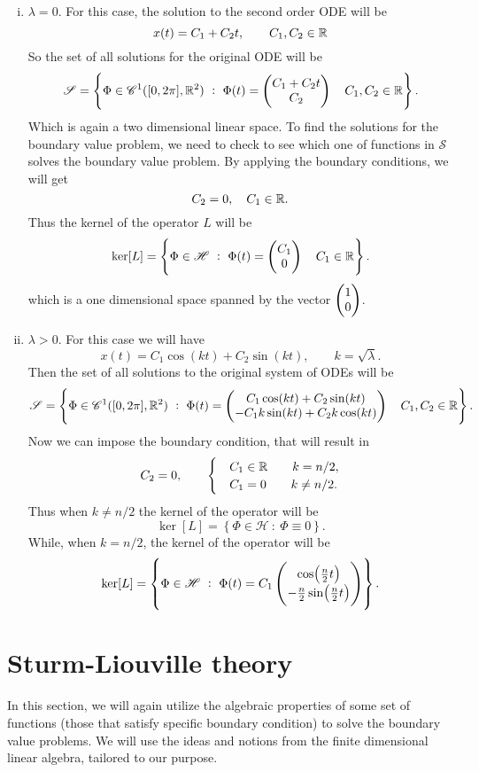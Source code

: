 \begin{example}
\begin{enumerate}[(i)]
		\item $\lambda = 0$. For this case, the solution to the second order ODE will be
		\[ x(t) = C_1 + C_2 t, \qquad C_1, C_2 \in \mathbb{R} \]
		So the set of all solutions for the original ODE will be
		\[ \mathscr{S} = \left\{ \Phi \in \mathscr{C}^1([0,2\pi],\mathbb{R}^2)\ :\ \Phi(t) = \begin{pmatrix} C_1 + C_2 t \\ C_2 \end{pmatrix} \quad C_1, C_2 \in \mathbb{R} \right\}.  \]
		Which is again a two dimensional linear space. To find the solutions for the boundary value problem, we need to check to see which one of functions in $\mathscr{S}$ solves the boundary value problem. By applying the boundary conditions, we will get
		\[ C_2 = 0, \quad C_1 \in \mathbb{R}. \]
		Thus the kernel of the operator $L$ will be
		\[ \ker[L] = \left\{ \Phi \in \mathscr{H}\ :\ \Phi(t) = \begin{pmatrix} C_1 \\ 0 \end{pmatrix} \quad C_1 \in \mathbb{R} \right\}. \]
		which is a one dimensional space spanned by the vector $\begin{pmatrix} 1 \\ 0 \end{pmatrix}$.
		
		\item $\lambda > 0 $. For this case we will have
		\[ x(t) = C_1 \cos(kt) + C_2 \sin(kt), \qquad k = \sqrt{\lambda}. \]
		Then the set of all solutions to the original system of ODEs will be
		\[ \mathscr{S} = \left\{ \Phi \in \mathscr{C}^1([0,2\pi],\mathbb{R}^2)\ :\ \Phi(t) = \begin{pmatrix} C_1 \cos(kt) + C_2 \sin(kt) \\ -C_1 k  \sin(kt) + C_2k \cos(kt) \end{pmatrix} \quad C_1, C_2 \in \mathbb{R} \right\}.  \] 
		Now we can impose the boundary condition, that will result in 
		\[ C_2= 0, \qquad 
		\begin{cases}
			& C_1 \in \mathbb{R} \qquad k = n/2,\\
			& C_1 = 0 \qquad k \neq n/2.
		\end{cases}
		\]
		 Thus when $k\neq n/2$ the kernel of the operator will be
		 \[ \ker\left[ L \right] = \left\{ \Phi \in \mathscr{H}\ :\ \Phi\equiv 0 \right\}. \]
		 While, when $k = n/2$, the kernel of the operator will be
		 \[ \ker[L] = \left\{ \Phi \in \mathscr{H}\ :\ \Phi(t) = C_1\begin{pmatrix} \cos(\frac{n}{2}t) \\ -\frac{n}{2} \sin(\frac{n}{2}t) \end{pmatrix} \right\}. \]
		
	\end{enumerate}
\end{example}

\section{Sturm-Liouville theory}
In this section, we will again utilize the algebraic properties of some set of functions (those that satisfy specific boundary condition) to solve the boundary value problems. We will use the ideas and notions from the finite dimensional linear algebra, tailored to our purpose. 

